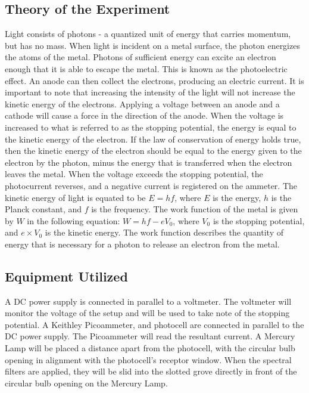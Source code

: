 \documentclass[a4paper]{article}
\begin{document}
\subsection{Theory of the Experiment}
\qq Light consists of photons - a quantized unit of energy that carries momentum, but has no mass. When
light is incident on a metal surface, the photon energizes the atoms of
the metal. Photons of sufficient energy can excite an electron enough that it is able to escape the metal. This
is known as the photoelectric effect. An anode can then collect the
electrons, producing an electric current. It is important to
note that increasing the intensity of the light will not increase the
kinetic energy of the electrons. Applying a voltage between an anode
and a cathode will cause a force in the direction of the anode. When the voltage
is increased to what is referred to as the stopping potential, the energy is equal to the kinetic energy of the electron. If the law of
conservation of energy holds true, then the kinetic energy of the
electron should be equal to the energy given to the electron by the
photon, minus the energy that is transferred when the electron leaves
the metal. When the voltage exceeds the stopping potential,
the photocurrent reverses, and a negative current is registered on the
ammeter. The kinetic energy of light is equated to be $E = hf$, where
$E$ is the energy, $h$ is the Planck constant, and $f$ is the
frequency. The work function of the metal is given by $W$ in the
following equation: $ W = h f - e V_0$, where $V_0$ is the
stopping potential, and $e \times V_0$ is the kinetic energy. The work
function describes the quantity of energy that is necessary for a
photon to release an electron from the metal.

\newpage 
\subsection{Equipment Utilized}

\qq A DC power supply is connected in parallel to a voltmeter. The
voltmeter will monitor the voltage of the setup and will be used to
take note of the stopping potential. A Keithley Picoammeter, and
photocell are connected in parallel to the DC power supply. The
Picoammeter will read the resultant current. A Mercury Lamp will be
placed a distance apart from the photocell, with the circular bulb
opening in alignment with the photocell's receptor window. When the
spectral filters are applied, they will be slid into the slotted grove
directly in front of the circular bulb opening on the Mercury Lamp. \\
\end{document}
